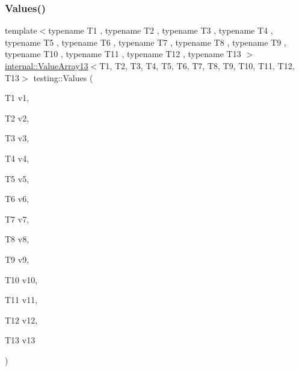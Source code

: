 \subsubsection{\texorpdfstring{Values()}{Values()}\hspace{0.1cm}{\footnotesize\ttfamily [13/50]}}
{\footnotesize\ttfamily template$<$typename T1 , typename T2 , typename T3 , typename T4 , typename T5 , typename T6 , typename T7 , typename T8 , typename T9 , typename T10 , typename T11 , typename T12 , typename T13 $>$ \\
\mbox{\hyperlink{classtesting_1_1internal_1_1ValueArray13}{internal\+::\+Value\+Array13}}$<$T1, T2, T3, T4, T5, T6, T7, T8, T9, T10, T11, T12, T13$>$ testing\+::\+Values (\begin{DoxyParamCaption}\item[{T1}]{v1,  }\item[{T2}]{v2,  }\item[{T3}]{v3,  }\item[{T4}]{v4,  }\item[{T5}]{v5,  }\item[{T6}]{v6,  }\item[{T7}]{v7,  }\item[{T8}]{v8,  }\item[{T9}]{v9,  }\item[{T10}]{v10,  }\item[{T11}]{v11,  }\item[{T12}]{v12,  }\item[{T13}]{v13 }\end{DoxyParamCaption})}

\mbox{\label{namespacetesting_a2d00ed785e0e796e6f36dc79c051dc76}} 
